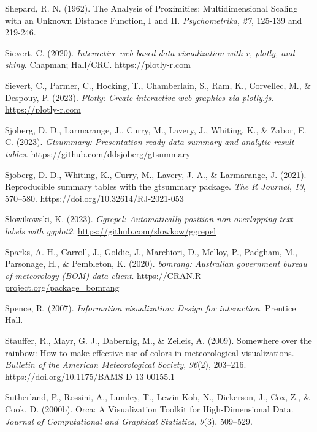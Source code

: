 \documentclass[
  letterpaper,
]{krantz}
\newlength{\cslhangindent}
\newenvironment{CSLReferences}[2] %
 {\begin{list}{}{%
  \setlength{\itemindent}{0pt}
  \setlength{\leftmargin}{0pt}
  \setlength{\parsep}{0pt}
  \ifodd #1
   \setlength{\leftmargin}{\cslhangindent}
   \setlength{\itemindent}{-1\cslhangindent}
  \fi
  \setlength{\itemsep}{#2\baselineskip}}}
 {\end{list}}
\begin{document}
\begin{CSLReferences}{1}{0}
Shepard, R. N. (1962). The {A}nalysis of {P}roximities:
{M}ultidimensional {S}caling with an {U}nknown {D}istance {F}unction,
{I} and {II}. \emph{Psychometrika}, \emph{27}, 125-139 and 219-246.

Sievert, C. (2020). \emph{Interactive web-based data visualization with
r, plotly, and shiny}. Chapman; Hall/CRC. \url{https://plotly-r.com}

Sievert, C., Parmer, C., Hocking, T., Chamberlain, S., Ram, K.,
Corvellec, M., \& Despouy, P. (2023). \emph{Plotly: Create interactive
web graphics via plotly.js}. \url{https://plotly-r.com}

Sjoberg, D. D., Larmarange, J., Curry, M., Lavery, J., Whiting, K., \&
Zabor, E. C. (2023). \emph{Gtsummary: Presentation-ready data summary
and analytic result tables}.
\url{https://github.com/ddsjoberg/gtsummary}

Sjoberg, D. D., Whiting, K., Curry, M., Lavery, J. A., \& Larmarange, J.
(2021). Reproducible summary tables with the gtsummary package.
\emph{{The R Journal}}, \emph{13}, 570--580.
\url{https://doi.org/10.32614/RJ-2021-053}

Slowikowski, K. (2023). \emph{Ggrepel: Automatically position
non-overlapping text labels with ggplot2}.
\url{https://github.com/slowkow/ggrepel}

Sparks, A. H., Carroll, J., Goldie, J., Marchiori, D., Melloy, P.,
Padgham, M., Parsonage, H., \& Pembleton, K. (2020). \emph{{bomrang}:
Australian government bureau of meteorology (BOM) data client}.
\url{https://CRAN.R-project.org/package=bomrang}

Spence, R. (2007). \emph{Information visualization: Design for
interaction}. Prentice Hall.

Stauffer, R., Mayr, G. J., Dabernig, M., \& Zeileis, A. (2009).
Somewhere over the rainbow: How to make effective use of colors in
meteorological visualizations. \emph{Bulletin of the American
Meteorological Society}, \emph{96}(2), 203--216.
\url{https://doi.org/10.1175/BAMS-D-13-00155.1}

Sutherland, P., Rossini, A., Lumley, T., Lewin-Koh, N., Dickerson, J.,
Cox, Z., \& Cook, D. (2000b). Orca: {A} {V}isualization {T}oolkit for
{H}igh-{D}imensional {D}ata. \emph{Journal of Computational and
Graphical Statistics}, \emph{9}(3), 509--529.


\end{CSLReferences}
\end{document}
